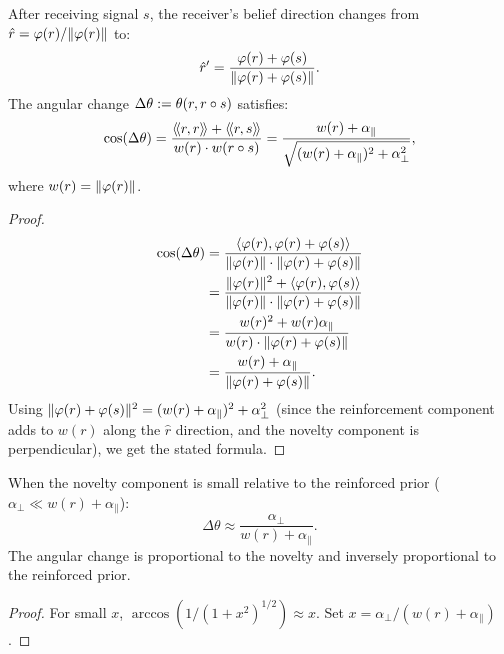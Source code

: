 \begin{theorem}
\label{thm:direction-change}
After receiving signal $s$, the receiver's belief direction changes from
$\hat{r} = \varphi(r)/\lVert \varphi(r) \rVert$ to:
\[
  \hat{r}' = \frac{\varphi(r) + \varphi(s)}{\lVert \varphi(r) + \varphi(s) \rVert}.
\]
The angular change $\Delta\theta := \theta(r,r \circ s)$ satisfies:
\[
  \cos(\Delta\theta) = \frac{\langle\!\langle r, r \rangle\!\rangle + \langle\!\langle r, s \rangle\!\rangle}{w(r) \cdot w(r \circ s)}
  = \frac{w(r) + \alpha_\parallel}{\sqrt{(w(r) + \alpha_\parallel)^2 +
  \alpha_\perp^2}},
\]
where $w(r) = \lVert \varphi(r) \rVert$.
\end{theorem}

\begin{proof}
\begin{align*}
  \cos(\Delta\theta)
  &= \frac{\langle \varphi(r), \varphi(r) + \varphi(s) \rangle}
          {\lVert \varphi(r) \rVert \cdot \lVert \varphi(r) + \varphi(s) \rVert} \\
  &= \frac{\lVert \varphi(r) \rVert^2 + \langle \varphi(r), \varphi(s) \rangle}
          {\lVert \varphi(r) \rVert \cdot \lVert \varphi(r) + \varphi(s) \rVert} \\
  &= \frac{w(r)^2 + w(r) \alpha_\parallel}
          {w(r) \cdot \lVert \varphi(r) + \varphi(s) \rVert} \\
  &= \frac{w(r) + \alpha_\parallel}{\lVert \varphi(r) + \varphi(s) \rVert}.
\end{align*}
Using $\lVert \varphi(r) + \varphi(s) \rVert^2 = (w(r) + \alpha_\parallel)^2 +
\alpha_\perp^2$ (since the reinforcement component adds to $w(r)$ along the
$\hat{r}$ direction, and the novelty component is perpendicular), we get the
stated formula.
\end{proof}

\begin{corollary}
\label{cor:small-novelty}
When the novelty component is small relative to the reinforced prior
($\alpha_\perp \ll w(r) + \alpha_\parallel$):
\[
  \Delta\theta \approx \frac{\alpha_\perp}{w(r) + \alpha_\parallel}.
\]
The angular change is proportional to the novelty and inversely proportional
to the reinforced prior.
\end{corollary}

\begin{proof}
For small $x$, $\arccos(1/(1 + x^2)^{1/2}) \approx x$. Set $x =
\alpha_\perp / (w(r) + \alpha_\parallel)$.
\end{proof}

